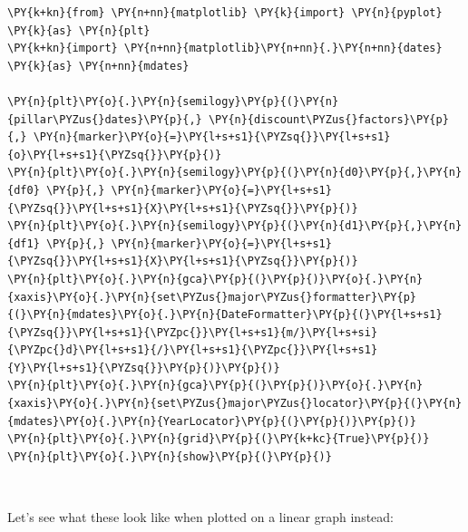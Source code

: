 \begin{tcolorbox}[breakable, size=fbox, boxrule=1pt, pad at break*=1mm,colback=cellbackground, colframe=cellborder]
\begin{Verbatim}[commandchars=\\\{\}]
\PY{k+kn}{from} \PY{n+nn}{matplotlib} \PY{k}{import} \PY{n}{pyplot} \PY{k}{as} \PY{n}{plt}
\PY{k+kn}{import} \PY{n+nn}{matplotlib}\PY{n+nn}{.}\PY{n+nn}{dates} \PY{k}{as} \PY{n+nn}{mdates}

\PY{n}{plt}\PY{o}{.}\PY{n}{semilogy}\PY{p}{(}\PY{n}{pillar\PYZus{}dates}\PY{p}{,} \PY{n}{discount\PYZus{}factors}\PY{p}{,} \PY{n}{marker}\PY{o}{=}\PY{l+s+s1}{\PYZsq{}}\PY{l+s+s1}{o}\PY{l+s+s1}{\PYZsq{}}\PY{p}{)}
\PY{n}{plt}\PY{o}{.}\PY{n}{semilogy}\PY{p}{(}\PY{n}{d0}\PY{p}{,}\PY{n}{df0} \PY{p}{,} \PY{n}{marker}\PY{o}{=}\PY{l+s+s1}{\PYZsq{}}\PY{l+s+s1}{X}\PY{l+s+s1}{\PYZsq{}}\PY{p}{)}
\PY{n}{plt}\PY{o}{.}\PY{n}{semilogy}\PY{p}{(}\PY{n}{d1}\PY{p}{,}\PY{n}{df1} \PY{p}{,} \PY{n}{marker}\PY{o}{=}\PY{l+s+s1}{\PYZsq{}}\PY{l+s+s1}{X}\PY{l+s+s1}{\PYZsq{}}\PY{p}{)}
\PY{n}{plt}\PY{o}{.}\PY{n}{gca}\PY{p}{(}\PY{p}{)}\PY{o}{.}\PY{n}{xaxis}\PY{o}{.}\PY{n}{set\PYZus{}major\PYZus{}formatter}\PY{p}{(}\PY{n}{mdates}\PY{o}{.}\PY{n}{DateFormatter}\PY{p}{(}\PY{l+s+s1}{\PYZsq{}}\PY{l+s+s1}{\PYZpc{}}\PY{l+s+s1}{m/}\PY{l+s+si}{\PYZpc{}d}\PY{l+s+s1}{/}\PY{l+s+s1}{\PYZpc{}}\PY{l+s+s1}{Y}\PY{l+s+s1}{\PYZsq{}}\PY{p}{)}\PY{p}{)}
\PY{n}{plt}\PY{o}{.}\PY{n}{gca}\PY{p}{(}\PY{p}{)}\PY{o}{.}\PY{n}{xaxis}\PY{o}{.}\PY{n}{set\PYZus{}major\PYZus{}locator}\PY{p}{(}\PY{n}{mdates}\PY{o}{.}\PY{n}{YearLocator}\PY{p}{(}\PY{p}{)}\PY{p}{)}
\PY{n}{plt}\PY{o}{.}\PY{n}{grid}\PY{p}{(}\PY{k+kc}{True}\PY{p}{)}
\PY{n}{plt}\PY{o}{.}\PY{n}{show}\PY{p}{(}\PY{p}{)}
\end{Verbatim}
\end{tcolorbox}

\begin{center}
\end{center}
    { \hspace*{\fill} \\}

Let's see what these look like when plotted on a linear graph instead:
    
